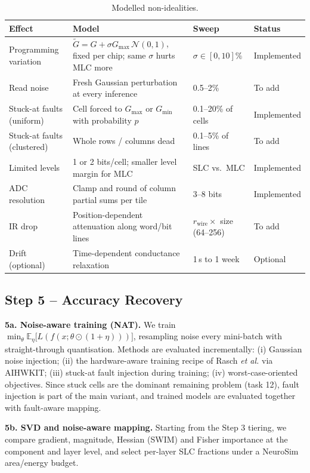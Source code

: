 \documentclass[10pt,a4paper]{article}
\begin{document}
\begin{table}[h]
\centering\small
\caption{Modelled non-idealities.}\label{tab:noise}
\begin{tabularx}{\linewidth}{@{}l X l l@{}}
\toprule
Effect & Model & Sweep & Status \\
\midrule
Programming variation & $\tilde G=G+\sigma G_{\max}\,\mathcal N(0,1)$, fixed per chip; same $\sigma$ hurts MLC more & $\sigma\in[0,10]\%$ & Implemented \\
Read noise & Fresh Gaussian perturbation at every inference & 0.5--2\% & To add \\
Stuck-at faults (uniform) & Cell forced to $G_{\max}$ or $G_{\min}$ with probability $p$ & 0.1--20\% of cells & Implemented \\
Stuck-at faults (clustered) & Whole rows / columns dead & 0.1--5\% of lines & To add \\
Limited levels & 1 or 2 bits/cell; smaller level margin for MLC & SLC vs.\ MLC & Implemented \\
ADC resolution & Clamp and round of column partial sums per tile & 3--8 bits & Implemented \\
IR drop & Position-dependent attenuation along word/bit lines & $r_{\mathrm{wire}}\times$ size (64--256) & To add \\
Drift (optional) & Time-dependent conductance relaxation & 1\,s to 1 week & Optional \\
\bottomrule
\end{tabularx}
\end{table}

\subsection{Step 5 -- Accuracy Recovery}
\textbf{5a. Noise-aware training (NAT).} We train
$\min_\theta \mathbb E_\eta\big[L(f(x;\theta\odot(1+\eta)))\big]$, resampling noise every mini-batch with
straight-through quantisation. Methods are evaluated incrementally: (i) Gaussian noise injection;
(ii) the hardware-aware training recipe of Rasch \emph{et al.} via AIHWKIT; (iii) stuck-at fault injection
during training; (iv) worst-case-oriented objectives. Since stuck cells are the dominant remaining problem
(task 12), fault injection is part of the main variant, and trained models are evaluated together with
fault-aware mapping.

\textbf{5b. SVD and noise-aware mapping.} Starting from the Step 3 tiering, we compare gradient,
magnitude, Hessian (SWIM) and Fisher importance at the component and layer level, and select per-layer
SLC fractions under a NeuroSim area/energy budget.
\end{document}
